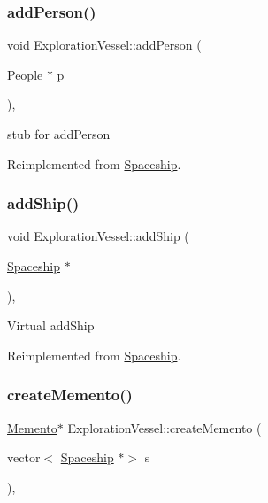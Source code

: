 \mbox{\label{classExplorationVessel_a7be654e42a9e83800abfb897d9b308b8}} 
\subsubsection{\texorpdfstring{add\+Person()}{addPerson()}}
{\footnotesize\ttfamily void Exploration\+Vessel\+::add\+Person (\begin{DoxyParamCaption}\item[{\hyperlink{classPeople}{People} $\ast$}]{p }\end{DoxyParamCaption})\hspace{0.3cm}{\ttfamily [inline]}, {\ttfamily [virtual]}}

stub for add\+Person 

Reimplemented from \hyperlink{classSpaceship_add8d9c6dfd5f6ecb8399e41e71e5b22f}{Spaceship}.

\mbox{\label{classExplorationVessel_ac6bc6807891edf928fae68e7ed850d14}} 
\subsubsection{\texorpdfstring{add\+Ship()}{addShip()}}
{\footnotesize\ttfamily void Exploration\+Vessel\+::add\+Ship (\begin{DoxyParamCaption}\item[{\hyperlink{classSpaceship}{Spaceship} $\ast$}]{ }\end{DoxyParamCaption})\hspace{0.3cm}{\ttfamily [inline]}, {\ttfamily [virtual]}}

Virtual add\+Ship 

Reimplemented from \hyperlink{classSpaceship_a90e1321cdbcb459b98b75ab39cef867d}{Spaceship}.

\mbox{\label{classExplorationVessel_a90a2c653d736fadf0599af87269fa36e}} 
\subsubsection{\texorpdfstring{create\+Memento()}{createMemento()}}
{\footnotesize\ttfamily \hyperlink{classMemento}{Memento}$\ast$ Exploration\+Vessel\+::create\+Memento (\begin{DoxyParamCaption}\item[{vector$<$ \hyperlink{classSpaceship}{Spaceship} $\ast$$>$}]{s }\end{DoxyParamCaption})\hspace{0.3cm}{\ttfamily [inline]}, {\ttfamily [virtual]}}

